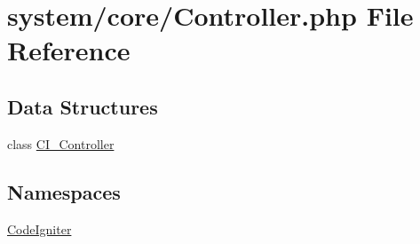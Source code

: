 \hypertarget{_controller_8php}{}\section{system/core/\+Controller.php File Reference}
\label{_controller_8php}
\subsection*{Data Structures}
\begin{DoxyCompactItemize}
\item 
class \mbox{\hyperlink{class_c_i___controller}{C\+I\+\_\+\+Controller}}
\end{DoxyCompactItemize}
\subsection*{Namespaces}
\begin{DoxyCompactItemize}
\item 
 \mbox{\hyperlink{namespace_code_igniter}{Code\+Igniter}}
\end{DoxyCompactItemize}
